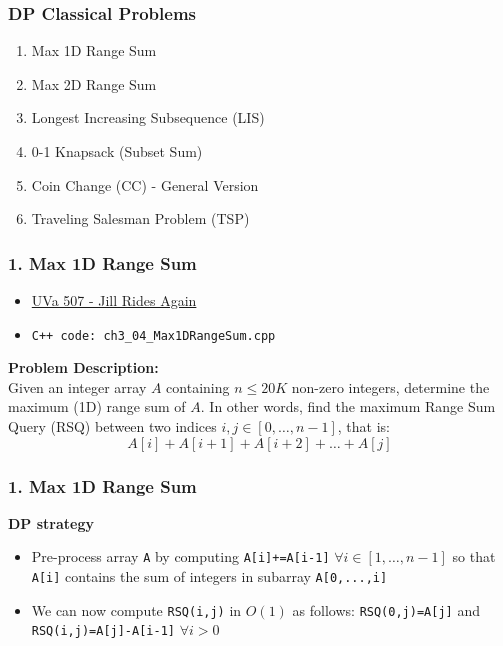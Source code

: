 \documentclass{beamer}
\begin{document}
\begin{frame}[fragile]
\frametitle{DP Classical Problems}

\begin{enumerate}
    \item Max 1D Range Sum
    \item Max 2D Range Sum
    \item Longest Increasing Subsequence (LIS)
    \item 0-1 Knapsack (Subset Sum)
    \item Coin Change (CC) - General Version
    \item Traveling Salesman Problem (TSP)
\end{enumerate}

\end{frame}

\begin{frame}[fragile]
\frametitle{1. Max 1D Range Sum}

\begin{itemize}
    \item \href{https://onlinejudge.org/index.php?option=com_onlinejudge&Itemid=8&category=7&page=show_problem&problem=448}{UVa 507 - Jill Rides Again}
    \item \color{red}\verb|C++ code: ch3_04_Max1DRangeSum.cpp|\color{black}
\end{itemize}

\vspace{0.3cm}

\color{red}\textbf{Problem Description: }\color{black} \\

Given an integer array $A$ containing $n \leq 20K$ non-zero integers, determine the maximum (1D) range sum of $A$. In other words, find the maximum Range Sum Query (RSQ) between two indices $i, j \in [0,\ldots,n-1]$, that is: $$A[i] + A[i+1] + A[i+2] +\ldots+ A[j]$$

\end{frame}

\begin{frame}[fragile]
\frametitle{1. Max 1D Range Sum}

\color{red}\textbf{DP strategy}\color{black} \\

\begin{itemize}
    \item Pre-process array \verb|A| by computing \verb|A[i]+=A[i-1]| $\forall i \in [1,\ldots,n-1]$ so that \verb|A[i]| contains the sum of integers in subarray \verb|A[0,...,i]|
    \item We can now compute \verb|RSQ(i,j)| in $O(1)$ as follows: \color{blue}\verb|RSQ(0,j)=A[j]| \color{black} and \color{blue}\verb|RSQ(i,j)=A[j]-A[i-1]| \color{black} $\forall i > 0$
\end{itemize}

\end{frame}
\end{document}
